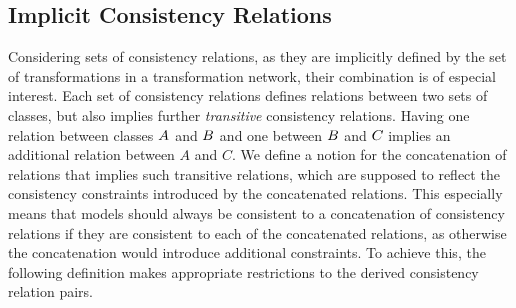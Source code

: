 



\subsection{Implicit Consistency Relations}

Considering sets of consistency relations, as they are implicitly defined by the set of transformations in a transformation network, their combination is of especial interest.
Each set of consistency relations defines relations between two sets of classes, but also implies further \emph{transitive} consistency relations.
Having one relation between classes $\class{A}{}$ and $\class{B}{}$ and one between $\class{B}{}$ and $\class{C}{}$ implies an additional relation between $A$ and $C$.
We define a notion for the concatenation of relations that implies such transitive relations, which are supposed to reflect the consistency constraints introduced by the concatenated relations.
This especially means that models should always be consistent to a concatenation of consistency relations if they are consistent to each of the concatenated relations, as otherwise the concatenation would introduce additional constraints.
To achieve this, the following definition makes appropriate restrictions to the derived consistency relation pairs.


